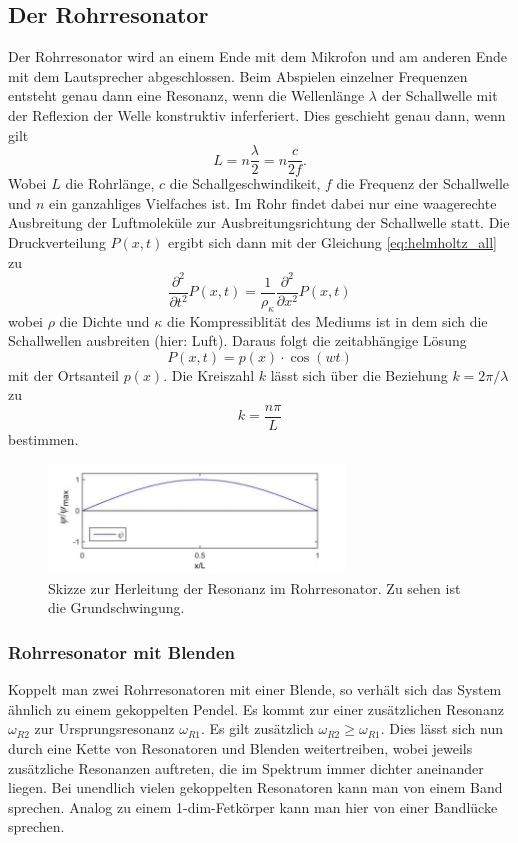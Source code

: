 \subsection{Der Rohrresonator}
Der Rohrresonator wird an einem Ende mit dem Mikrofon und am anderen Ende mit dem Lautsprecher abgeschlossen.
Beim Abspielen einzelner Frequenzen entsteht genau dann eine Resonanz, wenn die Wellenlänge $\lambda$ der Schallwelle
mit der Reflexion der Welle konstruktiv inferferiert. Dies geschieht genau dann, wenn gilt
\begin{equation}
    L=n\frac{\lambda}{2}=n\frac{c}{2f}.
\end{equation}
Wobei $L$ die Rohrlänge, $c$ die Schallgeschwindikeit, $f$ die Frequenz der Schallwelle und $n$ ein ganzahliges Vielfaches ist.
Im Rohr findet dabei nur eine waagerechte Ausbreitung der Luftmoleküle zur Ausbreitungsrichtung der Schallwelle statt.
Die Druckverteilung $P(x,t)$ ergibt sich dann mit der Gleichung \ref{eq:helmholtz_all} zu
\begin{equation}
    \frac{\partial^2}{\partial t^2}P(x,t)=\frac{1}{\rho_\kappa}\frac{\partial^2}{\partial x^2}P(x,t)
\end{equation}
\label{sec:Theorie}
wobei $\rho$ die Dichte und $\kappa$ die Kompressiblität des Mediums ist in dem sich die Schallwellen ausbreiten (hier: Luft).
Daraus folgt die zeitabhängige Lösung
\begin{equation}
    P(x,t)=p(x)\cdot \cos{(wt)}
    \label{eq:rohr_loe}
\end{equation}
mit der Ortsanteil $p(x)$.
Die Kreiszahl $k$ lässt sich über die Beziehung $k=2\pi/\lambda$ zu
\begin{equation}
    k=\frac{n\pi}{L}
\end{equation}
bestimmen.

\begin{figure}
    \center
    \includegraphics[width=0.7\textwidth]{bilder/Resonanz.jpg}
    \caption{Skizze zur Herleitung der Resonanz im Rohrresonator. Zu sehen ist die Grundschwingung. \cite{uni}}
\end{figure}

\subsubsection{Rohrresonator mit Blenden}
Koppelt man zwei Rohrresonatoren mit einer Blende, so verhält sich das System ähnlich zu einem 
gekoppelten Pendel. Es kommt zur einer zusätzlichen Resonanz $\omega_{R2}$ zur Ursprungsresonanz $\omega_{R1}$.
Es gilt zusätzlich $\omega_{R2}\geq \omega_{R1}$. Dies lässt sich nun durch eine Kette von Resonatoren und Blenden weitertreiben, wobei
jeweils zusätzliche Resonanzen auftreten, die im Spektrum immer dichter aneinander liegen.
Bei unendlich vielen gekoppelten Resonatoren kann man von einem Band sprechen.
Analog zu einem 1-dim-Fetkörper kann man hier von einer Bandlücke sprechen.

